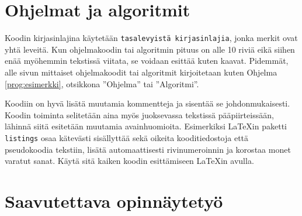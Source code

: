 
\section{Ohjelmat ja algoritmit}

Koodin kirjasinlajina käytetään \texttt{tasalevyistä kirjasinlajia}, jonka merkit ovat yhtä leveitä. Kun ohjelmakoodin tai algoritmin pituus on alle 10 riviä eikä siihen enää myöhemmin tekstissä viitata, se voidaan esittää kuten kaavat. Pidemmät, alle sivun mittaiset ohjelmakoodit tai algoritmit kirjoitetaan kuten Ohjelma \ref{prog:esimerkki}, otsikkona ''Ohjelma'' tai ''Algoritmi''.

Koodiin on hyvä lisätä muutamia kommentteja ja sisentää se johdonmukaisesti. Koodin toiminta selitetään aina myös juoksevassa tekstissä pääpiirteissään, lähinnä siitä esitetään muutamia avainhuomioita. Esimerkiksi \LaTeX{}in paketti \texttt{listings} \parencite{listings,notsoshort} osaa kätevästi sisällyttää sekä oikeita kooditiedostoja että pseudokoodia tekstiin, lisätä automaattisesti rivinumeroinnin ja korostaa monet varatut sanat. Käytä sitä kaiken koodin esittämiseen \LaTeX{}in avulla.

%

\section{Saavutettava opinnäytetyö}


